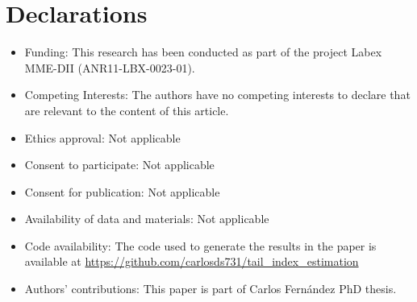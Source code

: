 \documentclass[sn-mathphys-ay]{sn-jnl}%
\begin{document}
\backmatter








\section*{Declarations}

\begin{itemize}
    \item Funding: This research has been conducted as part of the project Labex MME-DII
          (ANR11-LBX-0023-01).
    \item Competing Interests: The authors have no competing interests to declare that
          are relevant to the content of this article.
    \item Ethics approval: Not applicable
    \item Consent to participate: Not applicable
    \item Consent for publication: Not applicable
    \item Availability of data and materials: Not applicable
    \item Code availability: The code used to generate the results in the paper is
          available at \url{https://github.com/carlosds731/tail_index_estimation}
    \item Authors' contributions: This paper is part of Carlos Fernández PhD thesis.
\end{itemize}

\end{document}
